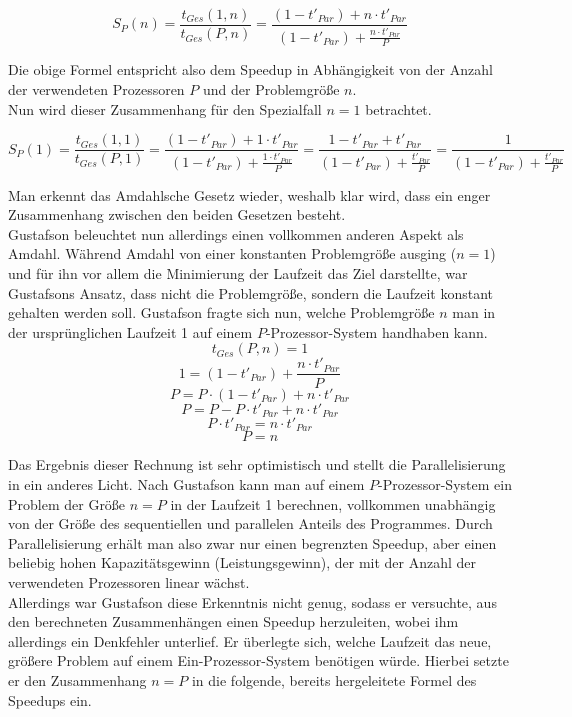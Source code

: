 				\[ S_P(n) = \frac{t_{Ges}(1, n)}{t_{Ges}(P, n)} = \frac{(1 - t'_{Par}) + n \cdot t'_{Par}}{(1 - t'_{Par}) + \frac{n \cdot t'_{Par}}{P}} \]
				
				Die obige Formel entspricht also dem Speedup in Abhängigkeit von der Anzahl der verwendeten Prozessoren $P$ und der Problemgröße $n$.\\
				Nun wird dieser Zusammenhang für den Spezialfall $n = 1$ betrachtet.
				
				\[ S_P(1) = \frac{t_{Ges}(1, 1)}{t_{Ges}(P, 1)} = \frac{(1 - t'_{Par}) + 1 \cdot t'_{Par}}{(1 - t'_{Par}) + \frac{1 \cdot t'_{Par}}{P}} = \frac{1 - t'_{Par} + t'_{Par}}{(1 - t'_{Par}) + \frac{t'_{Par}}{P}} = \frac{1}{(1 - t'_{Par}) + \frac{t'_{Par}}{P}} \]
				
				Man erkennt das Amdahlsche Gesetz wieder, weshalb klar wird, dass ein enger Zusammenhang zwischen den beiden Gesetzen besteht.\\
				Gustafson beleuchtet nun allerdings einen vollkommen anderen Aspekt als Amdahl. Während Amdahl von einer konstanten Problemgröße ausging ($n = 1$) und für ihn vor allem die Minimierung der Laufzeit das Ziel darstellte, war Gustafsons Ansatz, dass nicht die Problemgröße, sondern die Laufzeit konstant gehalten werden soll. Gustafson fragte sich nun, welche Problemgröße $n$ man in der ursprünglichen Laufzeit 1 auf einem $P$-Prozessor-System handhaben kann.\\
				
				\[ t_{Ges}(P, n) = 1 \]
				\[ 1 = (1 - t'_{Par}) + \frac{n \cdot t'_{Par}}{P} \]
				\[ P = P \cdot (1 - t'_{Par}) + n \cdot t'_{Par} \]
				\[ P = P - P \cdot t'_{Par} + n \cdot t'_{Par} \]
				\[ P \cdot t'_{Par} = n \cdot t'_{Par} \]
				\[ P = n \]
				
				Das Ergebnis dieser Rechnung ist sehr optimistisch und stellt die Parallelisierung in ein anderes Licht. Nach Gustafson kann man auf einem $P$-Prozessor-System ein Problem der Größe $n = P$ in der Laufzeit 1 berechnen, vollkommen unabhängig von der Größe des sequentiellen und parallelen Anteils des Programmes. Durch Parallelisierung erhält man also zwar nur einen begrenzten Speedup, aber einen beliebig hohen Kapazitätsgewinn (Leistungsgewinn), der mit der Anzahl der verwendeten Prozessoren linear wächst.\\
				Allerdings war Gustafson diese Erkenntnis nicht genug, sodass er versuchte, aus den berechneten Zusammenhängen einen Speedup herzuleiten, wobei ihm allerdings ein Denkfehler unterlief. Er überlegte sich, welche Laufzeit das neue, größere Problem auf einem Ein-Prozessor-System benötigen würde. Hierbei setzte er den Zusammenhang $n = P$ in die folgende, bereits hergeleitete Formel des Speedups ein.
				

